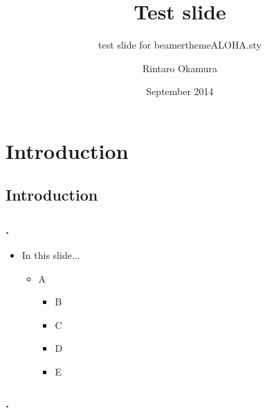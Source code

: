 \documentclass[ignorenonframetext,14pt]{beamer}
\title[]{\HelvNeueB Test slide}
\subtitle{\HelvNeueB test slide for beamerthemeALOHA.sty}
\author[]{\HelvNeueT Rintaro Okamura}
\institute[]{\HelvNeueT\footnotesize Tohoku University}
\date[September 2014]{\HelvNeueT September 2014}
\def\wingdsqr{{\fontspec{Wingdings Regular} p}}
\def\wingdsqflr{{\fontspec{Wingdings Regular} v}}
\def\wingdrarrow{{\fontspec{Wingdings 3} g}}
\begin{document}
\begin{frame}
    \maketitle
    \thispagestyle{empty}
\end{frame}

\section{Introduction}

\subsection{Introduction}

\begin{frame}
    \frametitle{\insertsubsectionnumber. \insertsubsectionhead}

    \begin{itemize}
        \item[\Large \wingdrarrow] \large In this slide...
            \begin{itemize}
                \normalsize
                \item[\wingdsqr] A
                \begin{itemize}
                    \normalsize
                    \item[\wingdsqflr] \textcolor{ALHPink}{B}
                    \item[\wingdsqflr] \textcolor{ALHBlue}{C}
                    \item[\wingdsqflr] D
                    \item[\wingdsqflr] E
                \end{itemize}
            \end{itemize}
    \end{itemize}
\end{frame}

\begin{frame}
    \frametitle{\insertsubsectionnumber. \insertsubsectionhead}

\end{frame}


\end{document}
